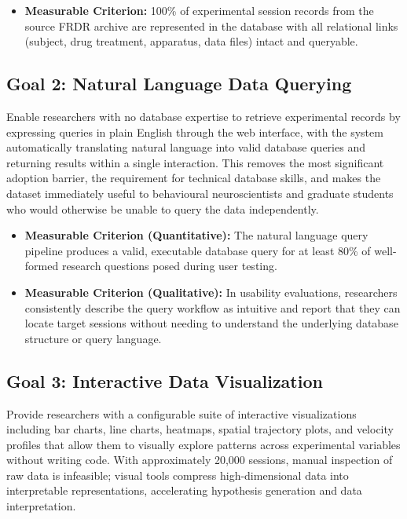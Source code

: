 \documentclass{article}
\begin{document}
  \begin{itemize}
    \item \textbf{Measurable Criterion:} 100\% of experimental session records from the source FRDR archive
    are represented in the database with all relational links (subject, drug treatment, apparatus, data files)
    intact and queryable.
  \end{itemize}

  \subsection{Goal 2: Natural Language Data Querying}
  
  \par{Enable researchers with no database expertise to retrieve experimental records by expressing queries in
  plain English through the web interface, with the system automatically translating natural language into valid
  database queries and returning results within a single interaction. This removes the most significant adoption
  barrier, the requirement for technical database skills, and makes the dataset immediately useful to
  behavioural neuroscientists and graduate students who would otherwise be unable to query the data
  independently.}
  
  \begin{itemize}
    \item \textbf{Measurable Criterion (Quantitative):} The natural language query pipeline produces a valid,
    executable database query for at least 80\% of well-formed research questions posed during user testing.
    \item \textbf{Measurable Criterion (Qualitative):} In usability evaluations, researchers consistently
    describe the query workflow as intuitive and report that they can locate target sessions without needing to
    understand the underlying database structure or query language.
  \end{itemize}

  \subsection{Goal 3: Interactive Data Visualization}
  
  \par{Provide researchers with a configurable suite of interactive visualizations including bar charts,
  line charts, heatmaps, spatial trajectory plots, and velocity profiles that allow them to visually explore
  patterns across experimental variables without writing code. With approximately 20,000 sessions, manual
  inspection of raw data is infeasible; visual tools compress high-dimensional data into interpretable
  representations, accelerating hypothesis generation and data interpretation.}
  
\end{document}
